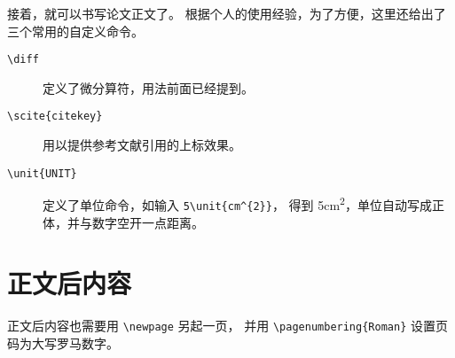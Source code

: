 接着，就可以书写论文正文了。
根据个人的使用经验，为了方便，这里还给出了三个常用的自定义命令。
\begin{description}
  \item[\texttt{\textbackslash{}diff}]
    定义了微分算符，用法前面已经提到。
  \item[\texttt{\textbackslash{}scite\{citekey\}}]
    用以提供参考文献引用的上标效果。
  \item[\texttt{\textbackslash{}unit\{UNIT\}}]
    定义了单位命令，如输入 \verb|5\unit{cm^{2}}|，
    得到 5\unit{cm^{2}}，单位自动写成正体，并与数字空开一点距离。
\end{description}

\section{正文后内容}

正文后内容也需要用 \verb|\newpage| 另起一页，
并用 \verb|\pagenumbering{Roman}| 设置页码为大写罗马数字。
